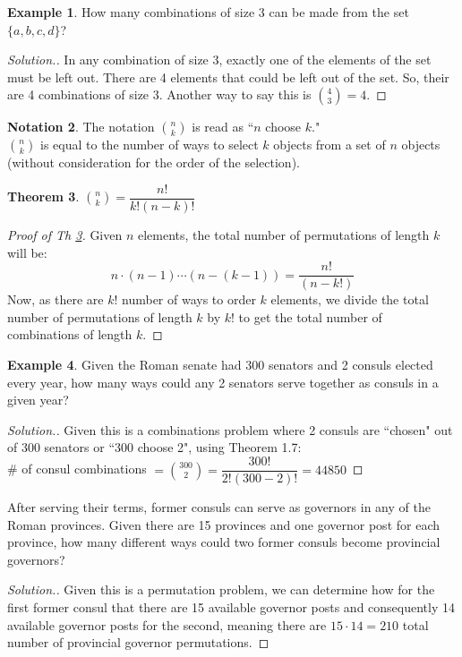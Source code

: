\documentclass[12pt]{article}
\renewcommand{\_}[1]{\underline{ #1 }}
\newtheorem{theorem}{Theorem}[section]
\theoremstyle{definition}
\newtheorem{example}[theorem]{Example}
\newtheorem{notation}[theorem]{Notation}
\numberwithin{equation}{subsection}
\begin{document}
\begin{example} 
	How many combinations of size 3 can be made from the set $\{a,b,c,d\}$?
	\begin{proof}[Solution.]
		In any combination of size 3, exactly one of the elements of the set must be left out. There are 4 elements that could be left out of the set. So, their are 4 combinations of size 3. Another way to say this is ${ 4\choose 3}=4$.
	\end{proof}
\end{example}

\begin{notation}
	The notation ${ n\choose k}$ is read as ``$n$ choose $k$."\\ ${ n\choose k}$ is equal to the number of ways to select $k$ objects from a set of $n$ objects (without consideration for the order of the selection).
\end{notation}

\begin{theorem}\label{combination}
	${n \choose k}=\dfrac{n!}{k! (n-k)!}$
\end{theorem}

\begin{proof}[Proof of Th \ref{combination}]
Given $n$ elements, the total number of permutations of length $k$ will be: \\
\[n\cdot (n-1)\cdots (n-(k-1))=\dfrac{n!}{(n-k!)}\]
Now, as there are $k!$ number of ways to order $k$ elements, we divide the total number of permutations of length $k$ by $k!$ to get the total number of combinations of length $k$.
\end{proof}

\begin{example}
Given the Roman senate had 300 senators and 2 consuls elected every year, how many ways could any 2 senators serve together as consuls in a given year?
\begin{proof}[Solution.]
	Given this is a combinations problem where 2 consuls are ``chosen" out of 300 senators or ``300 choose 2", using Theorem 1.7: \\
	\# of consul combinations $={300\choose 2}=\dfrac{300!}{2!(300-2)!}=44850$
\end{proof}
After serving their terms, former consuls can serve as governors in any of the Roman provinces. Given there are 15 provinces and one governor post for each province, how many different ways could two former consuls become provincial governors?
\begin{proof}[Solution.]
	Given this is a permutation problem, we can determine how for the first former consul that there are 15 available governor posts and consequently 14 available governor posts for the second, meaning there are $15\cdot 14 = 210$ total number of provincial governor permutations.
\end{proof}
\end{example}
\end{document}
